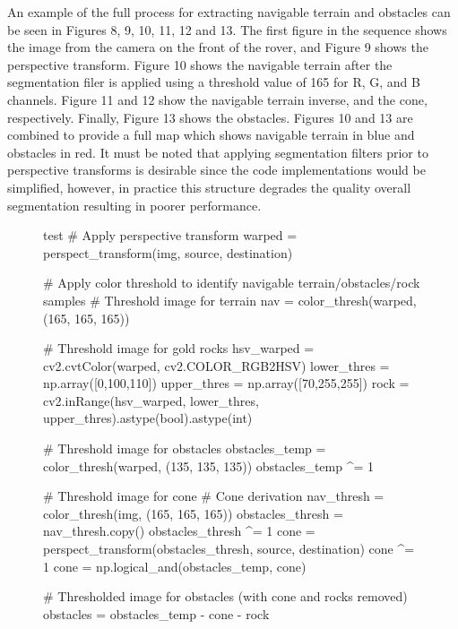 \documentclass[a4paper]{article}
\begin{document}
An example of the full process for extracting navigable terrain and obstacles can be seen in Figures 8, 9, 10, 11, 12 and 13. The first figure in the sequence shows the image from the camera on the front of the rover, and Figure 9 shows the perspective transform. Figure 10 shows the navigable terrain after the segmentation filer is applied using a threshold value of 165 for R, G, and B channels. Figure 11 and 12 show the navigable terrain inverse, and the cone, respectively. Finally, Figure 13 shows the obstacles. Figures 10 and 13 are combined to provide a full map which shows navigable terrain in blue and obstacles in red. It must be noted that applying segmentation filters prior to perspective transforms is desirable since the code implementations would be simplified, however, in practice this structure degrades the quality overall segmentation resulting in poorer performance.\\

\vspace{1cm}

\begin{figure}[h]\scriptsize
\begin{sexylisting}{test}
# Apply perspective transform
warped = perspect_transform(img, source, destination)
    
# Apply color threshold to identify navigable terrain/obstacles/rock samples
# Threshold image for terrain
nav = color_thresh(warped, (165, 165, 165))
    
# Threshold image for gold rocks
hsv_warped = cv2.cvtColor(warped, cv2.COLOR_RGB2HSV)
lower_thres = np.array([0,100,110])
upper_thres = np.array([70,255,255])
rock = cv2.inRange(hsv_warped, lower_thres, upper_thres).astype(bool).astype(int)
    
# Threshold image for obstacles
obstacles_temp = color_thresh(warped, (135, 135, 135))
obstacles_temp ^= 1
    
# Threshold image for cone
# Cone derivation
nav_thresh = color_thresh(img, (165, 165, 165))
obstacles_thresh = nav_thresh.copy()
obstacles_thresh ^= 1
cone = perspect_transform(obstacles_thresh, source, destination)
cone ^= 1
cone = np.logical_and(obstacles_temp, cone)
    
# Thresholded image for obstacles (with cone and rocks removed)
obstacles = obstacles_temp - cone - rock
\end{sexylisting}
\end{figure}
\end{document}

